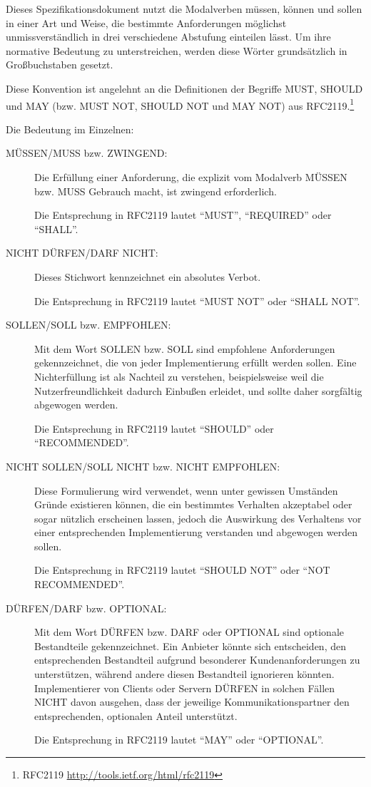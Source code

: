\documentclass[,a4paper]{article}
\begin{document}
Dieses Spezifikationsdokument nutzt die Modalverben müssen, können und
sollen in einer Art und Weise, die bestimmte Anforderungen möglichst
unmissverständlich in drei verschiedene Abstufung einteilen lässt. Um
ihre normative Bedeutung zu unterstreichen, werden diese Wörter
grundsätzlich in Großbuchstaben gesetzt.

Diese Konvention ist angelehnt an die Definitionen der Begriffe MUST,
SHOULD und MAY (bzw. MUST NOT, SHOULD NOT und MAY NOT) aus
RFC2119.\footnote{RFC2119 \url{http://tools.ietf.org/html/rfc2119}}

Die Bedeutung im Einzelnen:

\begin{description}
\item[MÜSSEN/MUSS bzw. ZWINGEND:]
Die Erfüllung einer Anforderung, die explizit vom Modalverb MÜSSEN bzw.
MUSS Gebrauch macht, ist zwingend erforderlich.

Die Entsprechung in RFC2119 lautet ``MUST'', ``REQUIRED'' oder
``SHALL''.
\item[NICHT DÜRFEN/DARF NICHT:]
Dieses Stichwort kennzeichnet ein absolutes Verbot.

Die Entsprechung in RFC2119 lautet ``MUST NOT'' oder ``SHALL NOT''.
\item[SOLLEN/SOLL bzw. EMPFOHLEN:]
Mit dem Wort SOLLEN bzw. SOLL sind empfohlene Anforderungen
gekennzeichnet, die von jeder Implementierung erfüllt werden sollen.
Eine Nichterfüllung ist als Nachteil zu verstehen, beispielsweise weil
die Nutzerfreundlichkeit dadurch Einbußen erleidet, und sollte daher
sorgfältig abgewogen werden.

Die Entsprechung in RFC2119 lautet ``SHOULD'' oder ``RECOMMENDED''.
\item[NICHT SOLLEN/SOLL NICHT bzw. NICHT EMPFOHLEN:]
Diese Formulierung wird verwendet, wenn unter gewissen Umständen Gründe
existieren können, die ein bestimmtes Verhalten akzeptabel oder sogar
nützlich erscheinen lassen, jedoch die Auswirkung des Verhaltens vor
einer entsprechenden Implementierung verstanden und abgewogen werden
sollen.

Die Entsprechung in RFC2119 lautet ``SHOULD NOT'' oder ``NOT
RECOMMENDED''.
\item[DÜRFEN/DARF bzw. OPTIONAL:]
Mit dem Wort DÜRFEN bzw. DARF oder OPTIONAL sind optionale Bestandteile
gekennzeichnet. Ein Anbieter könnte sich entscheiden, den entsprechenden
Bestandteil aufgrund besonderer Kundenanforderungen zu unterstützen,
während andere diesen Bestandteil ignorieren könnten. Implementierer von
Clients oder Servern DÜRFEN in solchen Fällen NICHT davon ausgehen, dass
der jeweilige Kommunikationspartner den entsprechenden, optionalen
Anteil unterstützt.

Die Entsprechung in RFC2119 lautet ``MAY'' oder ``OPTIONAL''.
\end{description}
\end{document}
